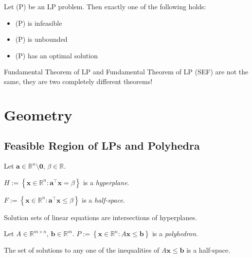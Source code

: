 \begin{thmbox}
    \begin{theorem}
        Let (P) be an LP problem. Then exactly one of the following holds:
        \begin{itemize}
            \item (P) is infeasible
            \item (P) is unbounded
            \item (P) has an optimal solution
        \end{itemize}
    \end{theorem}
\end{thmbox}
\begin{remark}
    Fundamental Theorem of LP and Fundamental Theorem of LP (SEF) are not
    the same, they are two completely different theorems!
\end{remark}

\section{Geometry}
\subsection{Feasible Region of LPs and Polyhedra}

\begin{defbox}
    \begin{definition}
        Let $ \bm{a} \in \mathbb{R}^n\setminus{\bm{0}} $, $ \beta \in\mathbb{R} $.

        $ H:=\left\{\bm{x}\in\mathbb{R}^n:
            \bm{a} ^\top \bm{x}=\beta \right\} $ is a \emph{hyperplane}.

        $ F:=\left\{\bm{x}\in\mathbb{R}^n:
            \bm{a} ^\top \bm{x}\leqslant \beta\right\} $ is a \emph{half-space}.
    \end{definition}
\end{defbox}

Solution sets of linear equations are intersections of hyperplanes.

\begin{defbox}
    \begin{definition}
        Let $ A\in \mathbb{R}^{m \times n} $, $ \bm{b}\in \mathbb{R}^m $.
        $ P:=\left\{\bm{x}\in\mathbb{R}^n:A\bm{x}\leqslant \bm{b}\right\} $ is a \emph{polyhedron}.
    \end{definition}
\end{defbox}
\begin{remark}
    The set of solutions to any one of the inequalities of
    $ A\bm{x}\leqslant \bm{b} $ is a half-space.
\end{remark}

